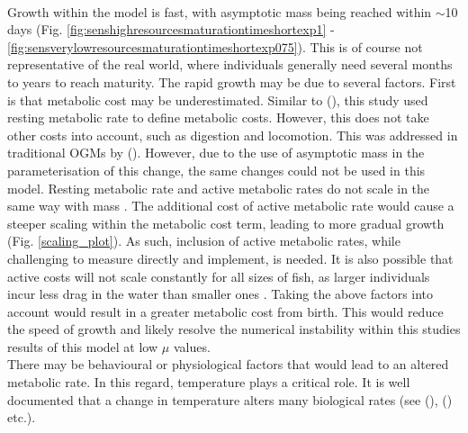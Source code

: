 \documentclass[a4paper, 11pt, hidelinks]{article} %
\begin{document}
	\\
	Growth within the model is fast, with asymptotic mass being reached within $\sim$10 days (Fig. \ref{fig:senshighresourcesmaturationtimeshortexp1} - \ref{fig:sensverylowresourcesmaturationtimeshortexp075}).
	This is of course not representative of the real world, where individuals generally need several months to years to reach maturity.	
	The rapid growth may be due to several factors.  First is that metabolic cost may be underestimated.  Similar to \citeauthor{West2001} (\citeyear{West2001}), this study used resting metabolic rate to define metabolic costs.  However, this does not take other costs into account, such as digestion and locomotion.
	This was addressed in traditional OGMs by \citeauthor{Hou2008} (\citeyear{Hou2008}).  However, due to the use of asymptotic mass in the parameterisation of this change, the same changes could not be used in this model.  Resting metabolic rate and active metabolic rates do not scale in the same way with mass \parencite{Gillooly2001, Weibel2004}.  The additional cost of active metabolic rate would cause a steeper scaling within the metabolic cost term, leading to more gradual growth (Fig. \ref{scaling_plot}). 
	As such, inclusion of active metabolic rates, while challenging to measure directly and implement, is needed.  It is also possible that active costs will not scale constantly for all sizes of fish, as larger individuals incur less drag in the water than smaller ones \parencite{Muller2000}.  Taking the above factors into account would result in a greater metabolic cost from birth.  This would reduce the speed of growth and likely resolve the numerical instability within this studies results of this model at low $ \mu $ values.
	\\
	There may be behavioural or physiological factors that would lead to an altered metabolic rate.  
	In this regard, temperature plays a critical role.  It is well documented that a change in temperature alters many biological rates  (see \citeauthor{Peters1983} (\citeyear{Peters1983}), \citeauthor{Gillooly2001} (\citeyear{Gillooly2001}) etc.).  
\end{document}

